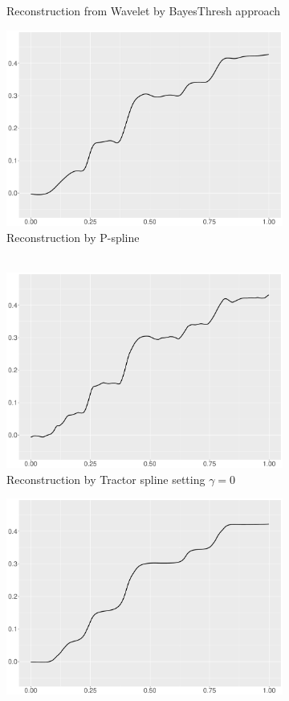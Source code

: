 \begin{figure}
\begin{subfigure}{0.45\textwidth}
    \caption{Reconstruction from Wavelet by BayesThresh approach}
    \end{subfigure}
    \begin{subfigure}{0.45\textwidth}
    \centering
    \includegraphics[width=\linewidth,height=0.45\textwidth]{Chapters/02TractorSplineTheory/plot/ggplot/ggBumpsPSpline.pdf}
    \caption{Reconstruction by P-spline \\\mbox{  } }
    \end{subfigure}
    \begin{subfigure}{0.45\textwidth}
    \centering
    \includegraphics[width=\linewidth,height=0.45\textwidth]{Chapters/02TractorSplineTheory/plot/ggplot/ggBumpsGamma.pdf}
    \caption{Reconstruction by Tractor spline setting $\gamma=0$}
    \end{subfigure}
  \begin{subfigure}{0.45\textwidth}
    \centering
    \includegraphics[width=\linewidth,height=0.45\textwidth]{Chapters/02TractorSplineTheory/plot/ggplot/ggBumpsTractorAPT.pdf}

\end{subfigure}
\end{figure}

